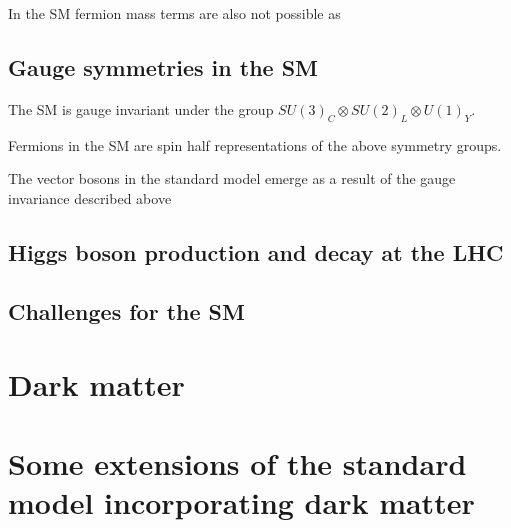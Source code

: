 In the SM fermion mass terms are also not possible as 



\subsection{Gauge symmetries in the SM}
The SM is gauge invariant under the group $SU\left(3\right)_{C}\otimes SU\left(2\right)_{L}\otimes U\left(1\right)_{Y}$. 

Fermions in the SM are spin half representations of the above symmetry groups.

The vector bosons in the standard model emerge as a result of the gauge invariance described above 






\subsection{Higgs boson production and decay at the LHC}


\subsection{Challenges for the SM}
\label{sec:SMchallenges}


\section{Dark matter}
\label{sec:DM}

\section{Some extensions of the standard model incorporating dark matter}
\label{sec:DMextensions}
